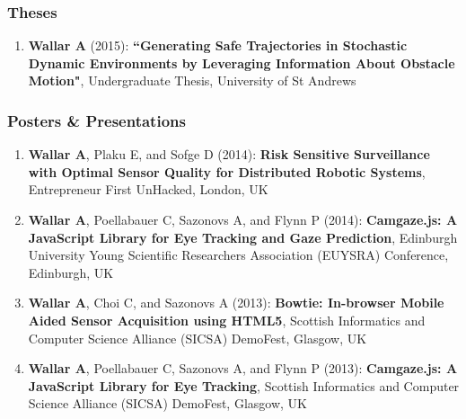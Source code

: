 \documentclass[line,margin]{cv}
\begin{document}
\begin{resume}
\begin{enumerate}
\end{enumerate}

\subsubsection{Theses}

\begin{enumerate}

    \item \textbf{Wallar A} (2015): \textbf{``Generating Safe Trajectories
        in Stochastic Dynamic Environments by Leveraging Information About
        Obstacle Motion"}, Undergraduate Thesis, University of St Andrews

\end{enumerate}


\subsubsection{Posters \& Presentations}

\begin{enumerate}

    \item \textbf{Wallar A}, Plaku E, and Sofge D (2014): \textbf{Risk
        Sensitive Surveillance with Optimal Sensor Quality for Distributed
        Robotic Systems}, Entrepreneur First UnHacked, London, UK

    \item \textbf{Wallar A}, Poellabauer C, Sazonovs A, and Flynn P (2014):
        \textbf{Camgaze.js: A JavaScript Library for Eye Tracking and Gaze
        Prediction}, Edinburgh University Young Scientific Researchers
        Association (EUYSRA) Conference, Edinburgh, UK

    \item \textbf{Wallar A}, Choi C, and Sazonovs A (2013): \textbf{Bowtie:
        In-browser Mobile Aided Sensor Acquisition using HTML5}, Scottish
        Informatics and Computer Science Alliance (SICSA) DemoFest,
        Glasgow, UK

    \item \textbf{Wallar A}, Poellabauer C, Sazonovs A, and Flynn P (2013):
        \textbf{Camgaze.js: A JavaScript Library for Eye Tracking}, Scottish
        Informatics and Computer Science Alliance (SICSA) DemoFest, Glasgow, UK

\end{enumerate}

\end{resume}
\end{document}
